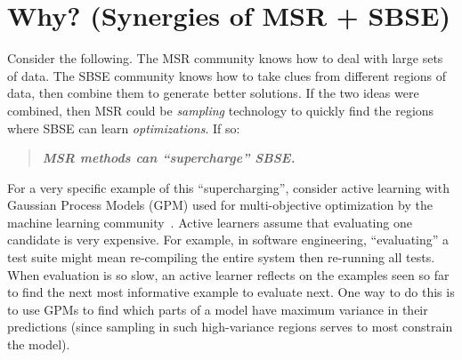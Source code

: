 \documentclass[sigconf,anonymous,review]{acmart}
\begin{document}
\section{  Why? (Synergies of MSR + SBSE)} \label{sec:why}










Consider the following. The MSR
community knows how to deal with large sets of data. The SBSE community knows how to take
clues from different regions of data, then combine them to generate better solutions.
If the two ideas were combined, then  MSR could be  {\em sampling} technology to quickly
find the regions where SBSE  can learn {\em  optimizations}. If so:
\begin{quote}
\centering
{\bf {\em   MSR  methods can ``supercharge''    SBSE.}}
\end{quote}
For a very specific example of this ``supercharging'', consider active learning
with Gaussian Process Models (GPM) used for multi-objective optimization
by the machine learning community~\cite{zuluaga2016varepsilon}.  Active learners assume that evaluating one candidate
is very expensive. For example, in software engineering, ``evaluating'' a test suite
might mean re-compiling
the entire system then re-running all tests. When evaluation is so slow,
an active learner reflects on the examples seen so far to find the next most informative
example to evaluate next. One way to do this is to use GPMs  to
find which parts of a model have maximum variance in their predictions 
(since sampling
in such high-variance regions serves to most constrain the model).  
\end{document}
